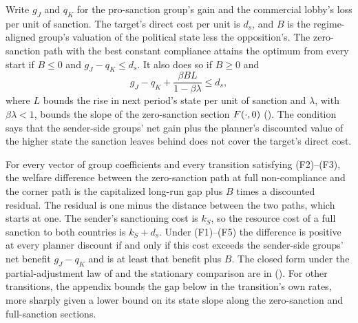  Write $g_J$
and $q_K$ for the pro-sanction group's gain and the commercial lobby's loss per
unit of sanction. The target's direct cost per unit is $d_s$, and $B$ is the
regime-aligned group's valuation of the political state less the opposition's.
The zero-sanction path with the best constant compliance attains the optimum
from every start if $B\le0$ and $g_J-q_K\le d_s$. It also does so
if $B\ge0$ and
\[
g_J-q_K+\frac{\beta BL}{1-\beta\lambda}\le d_s ,
\]
where $L$ bounds the rise in next period's state per unit of sanction and
$\lambda$, with $\beta\lambda<1$, bounds the slope of the zero-sanction section
$F(\cdot,0)$ (). The condition says that
the sender-side groups' net gain plus the planner's discounted value of the higher
state the sanction leaves behind does not cover the target's direct cost.

 For every vector of group coefficients and every transition satisfying
\textup{(F2)--(F3)}, the welfare difference between the zero-sanction path at full
non-compliance and the corner path is the capitalized long-run gap plus $B$ times a
discounted residual. The residual is one minus the distance between the two paths, which starts at
one. The sender's sanctioning cost is $k_S$, so the resource cost of a full
sanction to both countries is $k_S+d_s$. Under \textup{(F1)--(F5)} the difference
is positive at every planner discount if and only if this cost exceeds the
sender-side groups' net benefit $g_J-q_K$ and is at least that benefit plus $B$. The closed form
under the partial-adjustment law of  and the stationary
comparison are in 
(). For other
transitions, the appendix bounds the gap below in the transition's own rates, more
sharply given a lower bound on its state slope along the zero-sanction and
full-sanction sections.

